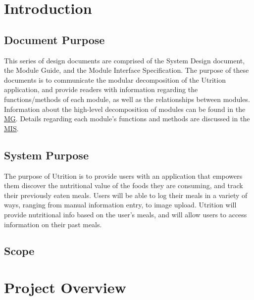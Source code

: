 \documentclass[12pt, titlepage]{article}
\begin{document}
\newpage

\tableofcontents

\listoftables

\listoffigures

\newpage


\section{Introduction}


\subsection{Document Purpose}

This series of design documents are comprised of the System Design document, 
the Module Guide, and the Module Interface Specification. The purpose of these 
documents is to communicate the modular decomposition of 
the Utrition application, and provide readers with information regarding the 
functions/methods of each module, as well as the relationships between modules. 
Information about the high-level decomposition of modules can be found in 
the \href{../SoftArchitecture/MG.pdf}{MG}.
Details regarding each module's functions and methods are discussed in 
the \href{../SoftDetailedDes/MIS.pdf}{MIS}.

\subsection{System Purpose}

The purpose of Utrition is to provide users with an application that empowers 
them discover the nutritional value of the foods they are consuming, and track
their previously eaten meals. Users will be able to log their meals in a 
variety of ways, ranging from manual information entry, to image upload. 
Utrition will provide nutritional info based on the user's meals, and will 
allow users to access information on their past meals.


\subsection{Scope}


\section{Project Overview}
\end{document}
